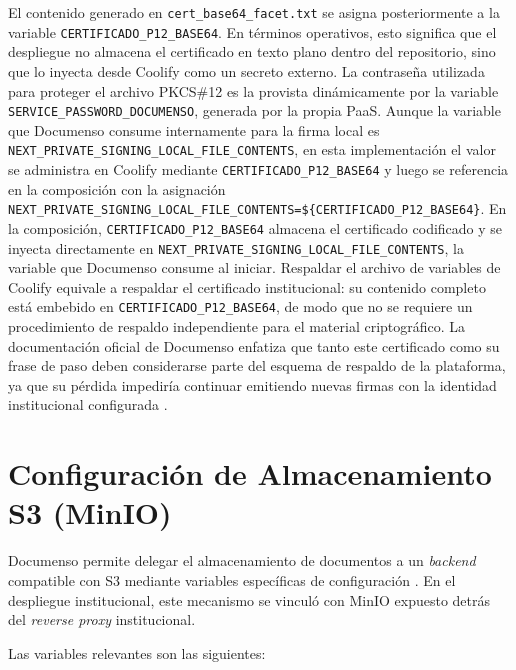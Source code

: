 El contenido generado en \texttt{cert\_base64\_facet.txt} se asigna posteriormente a la variable \texttt{CERTIFICADO\_P12\_BASE64}. En términos operativos, esto significa que el despliegue no almacena el certificado en texto plano dentro del repositorio, sino que lo inyecta desde Coolify como un secreto externo. La contraseña utilizada para proteger el archivo PKCS\#12 es la provista dinámicamente por la variable \texttt{SERVICE\_PASSWORD\_DOCUMENSO}, generada por la propia PaaS. Aunque la variable que Documenso consume internamente para la firma local es \texttt{NEXT\_PRIVATE\_SIGNING\_LOCAL\_FILE\_CONTENTS}, en esta implementación el valor se administra en Coolify mediante \texttt{CERTIFICADO\_P12\_BASE64} y luego se referencia en la composición con la asignación \texttt{NEXT\_\allowbreak PRIVATE\_\allowbreak SIGNING\_\allowbreak LOCAL\_\allowbreak FILE\_\allowbreak CONTENTS=\$\{\allowbreak CERTIFICADO\_\allowbreak P12\_\allowbreak BASE64\}}. En la composición, \texttt{CERTIFICADO\_P12\_BASE64} almacena el certificado codificado y se inyecta directamente en \texttt{NEXT\_PRIVATE\_SIGNING\_LOCAL\_FILE\_CONTENTS}, la variable que Documenso consume al iniciar. Respaldar el archivo de variables de Coolify equivale a respaldar el certificado institucional: su contenido completo está embebido en \texttt{CERTIFICADO\_P12\_BASE64}, de modo que no se requiere un procedimiento de respaldo independiente para el material criptográfico. La documentación oficial de Documenso enfatiza que tanto este certificado como su frase de paso deben considerarse parte del esquema de respaldo de la plataforma, ya que su pérdida impediría continuar emitiendo nuevas firmas con la identidad institucional configurada \cite{documenso_backups}.

\section{Configuración de Almacenamiento S3 (MinIO)}
\label{AppendixB:S3}

Documenso permite delegar el almacenamiento de documentos a un \textit{backend} compatible con S3 mediante variables específicas de configuración \cite{documenso_storage_config}. En el despliegue institucional, este mecanismo se vinculó con MinIO expuesto detrás del \textit{reverse proxy} institucional.

Las variables relevantes son las siguientes:

